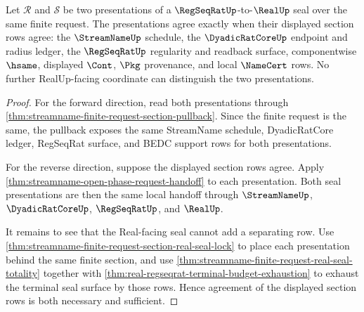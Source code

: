 \begin{theorem}
\label{thm:streamname-regseqrat-real-finite-request-section-lock}
Let $\mathcal{R}$ and $\mathcal{S}$ be two presentations of a
$\RegSeqRatUp$-to-$\RealUp$ seal over the same finite request. The
presentations agree exactly when their displayed section rows agree: the
$\StreamNameUp$ schedule, the $\DyadicRatCoreUp$ endpoint and radius ledger,
the $\RegSeqRatUp$ regularity and readback surface, componentwise $\hsame$,
displayed $\Cont$, $\Pkg$ provenance, and local $\NameCert$ rows. No further
RealUp-facing coordinate can distinguish the two presentations.
\end{theorem}
\begin{proof}
For the forward direction, read both presentations through
\autoref{thm:streamname-finite-request-section-pullback}. Since the finite
request is the same, the pullback exposes the same StreamName schedule,
DyadicRatCore ledger, RegSeqRat surface, and BEDC support rows for both
presentations.

For the reverse direction, suppose the displayed section rows agree. Apply
\autoref{thm:streamname-open-phase-request-handoff} to each presentation. Both
seal presentations are then the same local handoff through $\StreamNameUp$,
$\DyadicRatCoreUp$, $\RegSeqRatUp$, and $\RealUp$.

It remains to see that the Real-facing seal cannot add a separating row. Use
\autoref{thm:streamname-finite-request-section-real-seal-lock} to place each
presentation behind the same finite section, and use
\autoref{thm:streamname-finite-request-real-seal-totality} together with
\autoref{thm:real-regseqrat-terminal-budget-exhaustion} to exhaust the terminal
seal surface by those rows. Hence agreement of the displayed section rows is
both necessary and sufficient.
\end{proof}

